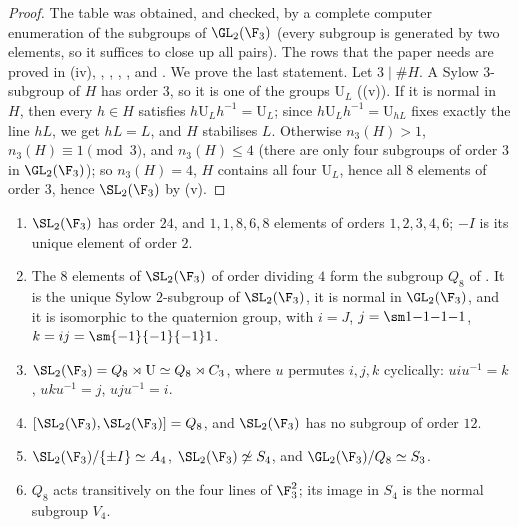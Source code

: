 \begin{proof}
The table was obtained, and checked, by a complete computer enumeration of the subgroups of $\GL_2(\F_3)$ (every subgroup is generated by two elements,
so it suffices to close up all pairs). The rows that the paper needs are proved in (iv), ,
, , ,  and . We prove the last
statement. Let $3\mid\#H$. A Sylow $3$-subgroup of $H$ has order $3$, so it is one of the groups $\mathrm U_L$ ((v)). If it is normal in $H$,
then every $h\in H$ satisfies $h\mathrm U_Lh^{-1}=\mathrm U_L$; since $h\mathrm U_Lh^{-1}=\mathrm U_{hL}$ fixes exactly the line $hL$, we get $hL=L$, and $H$ stabilises $L$. Otherwise
$n_3(H)>1$, $n_3(H)\equiv1\pmod3$, and $n_3(H)\le4$ (there are only four subgroups of order $3$ in $\GL_2(\F_3)$); so $n_3(H)=4$, $H$ contains all four $\mathrm U_L$, hence all
$8$ elements of order $3$, hence $\SL_2(\F_3)$ by (v).
\end{proof}

\begin{proposition}[$\SL_2(\F_3)$ and $Q_8$]\label{prop:groups:sl23}
\begin{enumerate}[label=(\roman*)]
\item $\SL_2(\F_3)$ has order $24$, and $1,1,8,6,8$ elements of orders $1,2,3,4,6$; $-I$ is its unique element of order $2$.
\item The $8$ elements of $\SL_2(\F_3)$ of order dividing $4$ form the subgroup $Q_8$ of . It is the unique Sylow $2$-subgroup of
$\SL_2(\F_3)$, it is normal in $\GL_2(\F_3)$, and it is isomorphic to the quaternion group, with $i=J$, $j=\sm1{-1}{-1}{-1}$, $k=ij=\sm{-1}{-1}{-1}1$.
\item $\SL_2(\F_3)=Q_8\rtimes\mathrm U\simeq Q_8\rtimes C_3$, where $u$ permutes $i,j,k$ cyclically: $uiu^{-1}=k$, $uku^{-1}=j$, $uju^{-1}=i$.
\item $[\SL_2(\F_3),\SL_2(\F_3)]=Q_8$, and $\SL_2(\F_3)$ has no subgroup of order $12$.
\item $\SL_2(\F_3)/\{\pm I\}\simeq A_4$, $\SL_2(\F_3)\not\simeq S_4$, and $\GL_2(\F_3)/Q_8\simeq S_3$.
\item $Q_8$ acts transitively on the four lines of $\F_3^2$; its image in $S_4$ is the normal subgroup $V_4$.
\end{enumerate}
\end{proposition}

